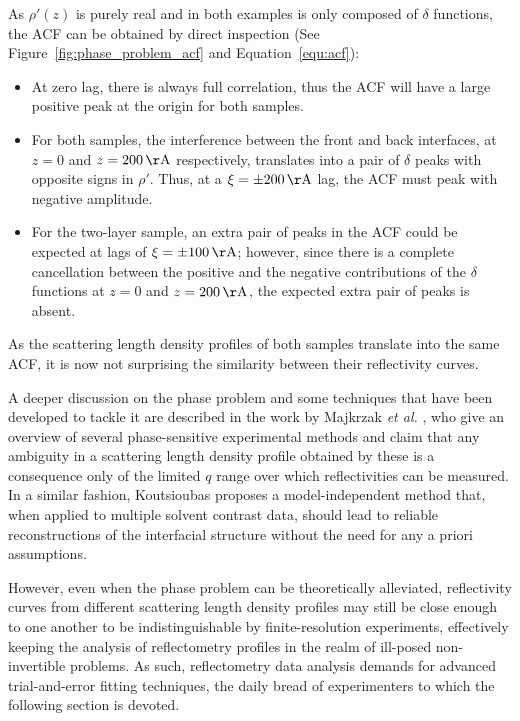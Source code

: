 \documentclass[
 reprint,
 superscriptaddress,
 amsmath,amssymb,
 aps,
]{revtex4-1}
\newcommand{\angstrom}{\rm{\AA}}
\begin{document}
As $\rho'(z)$ is purely real and in both examples is only composed of $\delta$ functions, the ACF can be obtained by direct inspection (See Figure~\ref{fig:phase_problem_acf} and Equation~\ref{equ:acf}):
\begin{itemize}
    \item At zero lag, there is always full correlation, thus the ACF will have a large positive peak at the origin for both samples.
    \item For both samples, the interference between the front and back interfaces, at $z = 0$ and $z = \SI{200}{\angstrom}$ respectively, translates into a pair of $\delta$ peaks with opposite signs in $\rho'$. Thus, at a $\xi = \pm \SI{200}{\angstrom}$ lag, the ACF must peak with negative amplitude.
    \item For the two-layer sample, an extra pair of peaks in the ACF could be expected at lags of $\xi = \pm \SI{100}{\angstrom}$; however, since there is a complete cancellation between the positive and the negative contributions of the $\delta$ functions at $z = 0$ and $z = \SI{200}{\angstrom}$, the expected extra pair of peaks is absent.
\end{itemize}
As the scattering length density profiles of both samples translate into the same ACF, it is now not surprising the similarity between their reflectivity curves.

A deeper discussion on the phase problem and some techniques that have been developed to tackle it are described in the work by Majkrzak \emph{et al.} \cite{majkrzak_phase_2003}, who give an overview of several phase-sensitive experimental methods and claim that any ambiguity in a scattering length density profile obtained by these is a consequence only of the limited $q$ range over which reflectivities can be measured.
In a similar fashion, Koutsioubas \cite{koutsioubas_model_2019} proposes a model-independent method that, when applied to multiple solvent contrast data, should lead to reliable reconstructions of the interfacial structure without the need for any a priori assumptions.

However, even when the phase problem can be theoretically alleviated, reflectivity curves from different scattering length density profiles may still be close enough to one another to be indistinguishable by finite-resolution experiments, effectively keeping the analysis of reflectometry profiles in the realm of ill-posed non-invertible problems.
As such, reflectometry data analysis demands for advanced trial-and-error fitting techniques, the daily bread of experimenters to which the following section is devoted.
\end{document}
